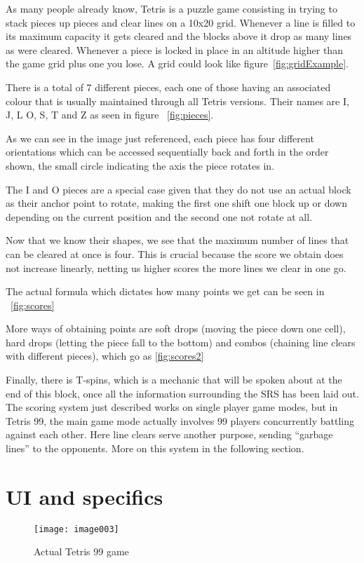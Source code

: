 As many people already know, Tetris is a puzzle game consisting in trying to stack pieces up pieces and clear lines on a 10x20 grid. Whenever a line is filled to its maximum capacity it gets cleared and the blocks above it drop as many lines as were cleared. Whenever a piece is locked in place in an altitude higher than the game grid plus one you lose. A grid could look like figure~\ref{fig:gridExample}.

There is a total of 7 different pieces, each one of those having an associated colour that is usually maintained through all Tetris versions. Their names are I, J, L O, S, T and Z as seen in figure ~\ref{fig:pieces}.

As we can see in the image just referenced, each piece has four different orientations which can be accessed sequentially back and forth in the order shown, the small circle indicating the axis the piece rotates in.

The I and O pieces are a special case given that they do not use an actual block as their anchor point to rotate, making the first one shift one block up or down depending on the current position and the second one not rotate at all.

Now that we know their shapes, we see that the maximum number of lines that can be cleared at once is four. This is crucial because the score we obtain does not increase linearly, netting us higher scores the more lines we clear in one go.

The actual formula which dictates how many points we get can be seen in ~\ref{fig:scores}

More ways of obtaining points are soft drops (moving the piece down one cell), hard drops (letting the piece fall to the bottom) and combos (chaining line clears with different pieces), which go as \ref{fig:scores2}

Finally, there is T-spins, which is a mechanic that will be spoken about at the end of this block, once all the information surrounding the SRS has been laid out.
The scoring system just described works on single player game modes, but in Tetris 99, the main game mode actually involves 99 players concurrently battling against each other. Here line clears serve another purpose, sending “garbage lines” to the opponents. More on this system in the following section.


\section{UI and specifics}
\begin{figure}[]
\centering
\texttt{[image: image003]}
\caption{\label{fig:tetris99game}Actual Tetris 99 game}
\end{figure}

